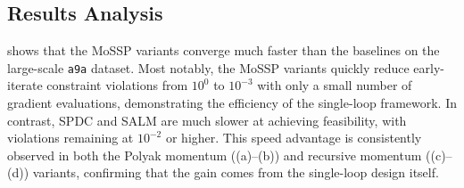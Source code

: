 \documentclass{article}
\theoremstyle{plain}
\theoremstyle{definition}
\theoremstyle{remark}
\numberwithin{equation}{section}
\begin{document}
\begin{table}[t]
\vspace{0.6em}

\begin{subtable}{\textwidth}
\centering
\caption{Mean \(\pm\) std of objective value (Obj. Value) and constraint violation (Const. Viol.) for MoSSP-R and two baseline methods with recursive momentum.}
\label{table:libsvm_result_Recursive}
\begin{small}
\begin{sc}
%
\end{sc}
\end{small}
\end{subtable}
\vskip -0.1in
\end{table}
\subsection{Results Analysis}
\label{Sec: Results Analysis}
 shows that the MoSSP variants converge much faster than the baselines on the large-scale \texttt{a9a} dataset. Most notably, the MoSSP variants quickly reduce early-iterate constraint violations from \(10^{0}\) to \(10^{-3}\) with only a small number of gradient evaluations, demonstrating the efficiency of the single-loop framework. In contrast, SPDC and SALM are much slower at achieving feasibility, with violations remaining at \(10^{-2}\) or higher.
This speed advantage is consistently observed in both the Polyak momentum ((a)--(b)) and recursive momentum ((c)--(d)) variants, confirming that the gain comes from the single-loop design itself.
\end{document}
